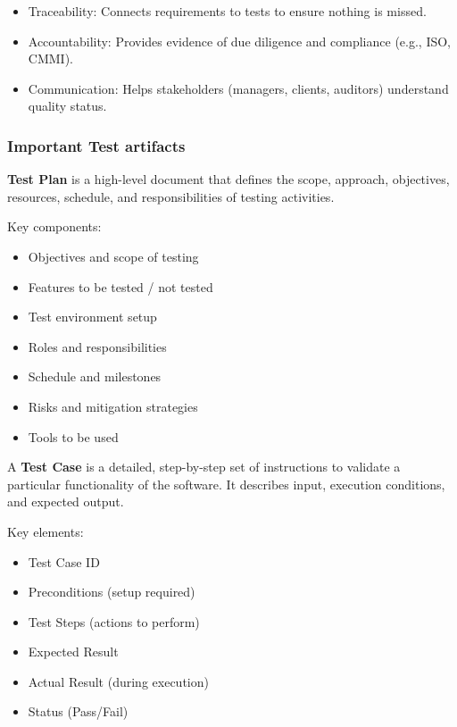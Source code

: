 \begin{itemize}
    \item Traceability: Connects requirements to tests to ensure nothing is missed.
    \item Accountability: Provides evidence of due diligence and compliance (e.g., ISO, CMMI).
    \item Communication: Helps stakeholders (managers, clients, auditors) understand quality status.
\end{itemize}

\subsubsection{Important Test artifacts}

\indent 

\textbf{Test Plan} is a high-level document that defines the scope, approach, objectives, resources, schedule, and responsibilities of testing activities.

Key components:

\begin{itemize}
    \item Objectives and scope of testing
    \item Features to be tested / not tested
    \item Test environment setup
    \item Roles and responsibilities
    \item Schedule and milestones
    \item Risks and mitigation strategies
    \item Tools to be used
\end{itemize}

\bigskip  

A \textbf{Test Case} is a detailed, step-by-step set of instructions to validate a particular functionality of the software. It describes input, execution conditions, and expected output.

Key elements:

\begin{itemize}
    \item Test Case ID
    \item Preconditions (setup required)
    \item Test Steps (actions to perform)
    \item Expected Result
    \item Actual Result (during execution)
    \item Status (Pass/Fail)
\end{itemize}

